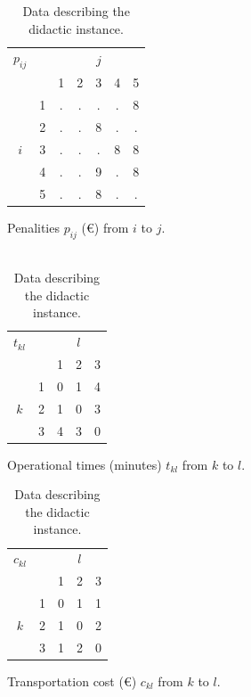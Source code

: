 \documentclass[preprint,12pt,authoryear]{elsarticle}
\begin{document}
\begin{table}[h]
\begin{subtable}{0.45\linewidth}
\begin{tabular}{c c|c c c c c|}
             $p_{ij}$       &      & \multicolumn{5}{c|}{$j$} \\
            &     & 1 & 2 & 3 & 4 & 5 \\
            \hline
            &  1 & . &  . &  . &  . &  8 \\
            &  2 & . &  . &  8 &  . &  . \\
            $i$ &  3 & . &  . &  .  & 8 &  8 \\
            &  4 & . &  . &  9 &  . &  8 \\
            &  5 & . &  . &  8 &  . &  . \\
            \end{tabular}
            \caption{Penalities $p_{ij}$ (\euro) from $i$ to $j$.\\$\mbox{ }$ }
            \label{tab:didacPenalites}
    \end{subtable}
    \vspace{3mm}
    
    \begin{subtable}{0.45\linewidth}
        \centering
            \begin{tabular}{c c|c c c|}

            $t_{kl}$       &      & \multicolumn{3}{c|}{$l$} \\
            &     & 1 & 2 & 3 \\        
            \hline
            &  1 &0 &  1 &  4 \\
            $k$    &  2 &      1 &  0 &  3 \\
            &  3 &      4 &  3 &  0 \\
            \hline   
            \end{tabular}
            \caption{Operational times (minutes)  $t_{kl}$ from $k$ to $l$.}
            \label{tab:didacCoutOpera}
    \end{subtable}
    \hfill
    \begin{subtable}{0.45\linewidth}
        \centering
            \begin{tabular}{c c|c c c|}
            $c_{kl}$       &      & \multicolumn{3}{c|}{$l$} \\
            &     & 1 & 2 & 3 \\        
             \hline
            &  1 &0 &  1 &  1 \\
            $k$    &  2 &1 &  0 &  2 \\
            &  3 &1 &  2 &  0 \\
             \hline          
            \end{tabular}
            \caption{Transportation cost (\euro) $c_{kl}$ from $k$ to $l$.}
            \label{tab:didacCoutTransp}
    \end{subtable}

    \caption{Data describing the didactic instance.}
    \label{tab:dataDidac}
\end{table}
\end{document}
